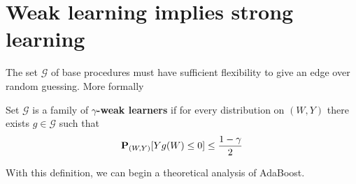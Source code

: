 \section{Weak learning implies strong learning}
The set $\mathcal{G}$ of base procedures must have sufficient flexibility to give an edge over random guessing. More formally
\begin{definition}
Set $\mathcal{G}$ is a family of \textbf{$\gamma$-weak learners} if for every distribution on $(W, Y)$ there exists $g \in \mathcal{G}$ such that
\begin{equation*}
	\mathbf{P}_{(W, Y)}[Yg(W) \le 0] \le \frac{1 - \gamma}{2}
\end{equation*}
\end{definition}

With this definition, we can begin a theoretical analysis of AdaBoost.

